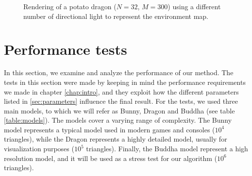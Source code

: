 \begin{figure}[!h]
\caption{Rendering of a potato dragon ($N = 32$, $M = 300$) using a different number of directional light to represent the environment map.}
\label{fig:dragonenv}
\end{figure}

\clearpage
\section{Performance tests}
\label{sec:perf}
In this section, we examine and analyze the performance of our method. The tests in this section were made by keeping in mind the performance requirements we made in chapter \ref{chap:intro}, and they exploit how the different parameters listed in \ref{sec:parameters} influence the final result. For the tests, we used three main models, to which we will refer as Bunny, Dragon and Buddha (see table \ref{table:models}). The models cover a varying range of complexity. The Bunny model represents a typical model used in modern games and consoles ($10^4$ triangles), while the Dragon represents a highly detailed model, usually for visualization purposes ($10^5$ triangles). Finally, the Buddha model represent a high resolution model, and it will be used as a stress test for our algorithm ($10^6$ triangles).

